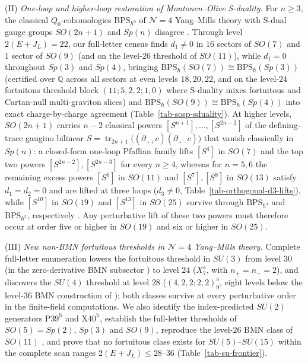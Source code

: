 \documentclass[11pt]{article}
\numberwithin{equation}{section}
\numberwithin{figure}{section}
\numberwithin{table}{section}
\begin{document}
(II) \emph{One-loop and higher-loop restoration of Montonen--Olive S-duality.} For $n\ge3$, the classical $Q_0$-cohomologies $\mathrm{BPS}_{\hbar^0}$ of $\mathcal N=4$ Yang--Mills theory with S-dual gauge groups $SO(2n+1)$ and $Sp(n)$ disagree \cite{ChangLin,GLRT}. Through level $2(E+J_L)=22$, our full-letter census finds $d_1\ne0$ in $16$ sectors of $SO(7)$ and $1$ sector of $SO(9)$ (and on the level-$26$ threshold of $SO(11)$), while $d_1=0$ throughout $Sp(3)$ and $Sp(4)$, bringing $\mathrm{BPS}_{\hbar}(SO(7))\cong\mathrm{BPS}_{\hbar}(Sp(3))$ (certified over $\mathbb Q$ across all sectors at even levels $18,20,22$, and on the level-$24$ fortuitous threshold block $(11;5,2,2;1,0)$ where S-duality mixes fortuitous and Cartan-null multi-graviton slices) and $\mathrm{BPS}_{\hbar}(SO(9))\cong\mathrm{BPS}_{\hbar}(Sp(4))$ into exact charge-by-charge agreement (Table~\ref{tab-sosp-sduality}). At higher levels, $SO(2n+1)$ carries $n-2$ classical powers $[S^{n+1}],\ldots,[S^{2n-2}]$ of the defining-trace gaugino bilinear $S=\operatorname{tr}_{2n+1}\bigl((\partial_{+\dot+}c)(\partial_{+\dot-}c)\bigr)$ that vanish classically in $Sp(n)$: a closed-form one-loop Pfaffian family lifts $[S^4]$ in $SO(7)$ and the top two powers $[S^{2n-2}],[S^{2n-3}]$ for every $n\ge4$, whereas for $n=5,6$ the remaining excess powers $[S^6]$ in $SO(11)$ and $[S^7],[S^8]$ in $SO(13)$ satisfy $d_1=d_2=0$ and are lifted at three loops ($d_3\ne0$, Table~\ref{tab-orthogonal-d3-lifts}), while $[S^{10}]$ in $SO(19)$ and $[S^{13}]$ in $SO(25)$ survive through $\mathrm{BPS}_{\hbar^4}$ and $\mathrm{BPS}_{\hbar^5}$, respectively \cite{Repo}. Any perturbative lift of these two powers must therefore occur at order five or higher in $SO(19)$ and six or higher in $SO(25)$.

(III) \emph{New non-BMN fortuitous thresholds in $\mathcal N=4$ Yang--Mills theory.} Complete full-letter enumeration lowers the fortuitous threshold in $SU(3)$ from level $30$ (in the zero-derivative BMN subsector \cite{CCKLL,KLLS,BraneFused}) to level $24$ ($X_7^{\mathrm{a}}$, with $n_+=n_-=2$), and discovers the $SU(4)$ threshold at level $28$ ($(4,2,2;2,2)_9^{\mathrm{a}}$, eight levels below the level-$36$ BMN construction of \cite{KLLS}); both classes survive at every perturbative order in the finite-field computations. We also identify the index-predicted $SU(2)$ generators $\mathrm{P39}^{\mathrm{b}}$ and $\mathrm{X40}^{\mathrm{b}}$, establish the full-letter thresholds of $SO(5)=Sp(2)$, $Sp(3)$ and $SO(9)$, reproduce the level-$26$ BMN class of $SO(11)$ \cite[Sections 6.2--6.3]{FortuityAI}, and prove that no fortuitous class exists for $SU(5)$--$SU(15)$ within the complete scan ranges $2(E+J_L)\le 28$--$36$ (Table~\ref{tab-su-frontier}).
\end{document}
